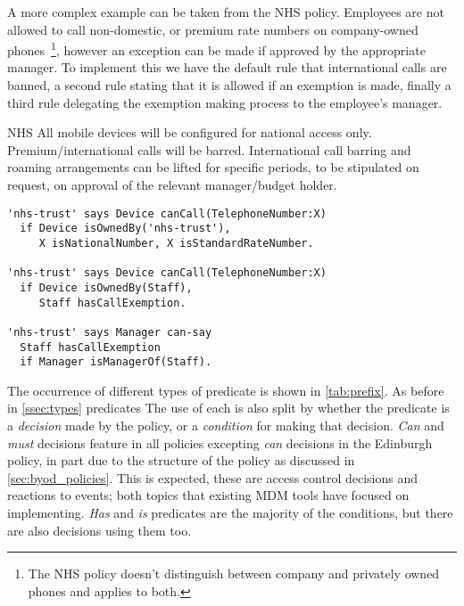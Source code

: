 \documentclass[thesis.tex]{subfiles}
\begin{document}
A more complex example can be taken from the NHS policy.
Employees are not allowed to call non-domestic, or premium rate numbers on
company-owned phones~\footnote{The NHS policy doesn't distinguish between
  company and privately owned phones and applies to both.}, however an exception can be made if approved by the appropriate manager.
To implement this we have the default rule that international calls are banned, a second rule stating that it is allowed if an exemption is made, finally a third rule delegating the exemption making process to the employee's manager.
\begin{policyrule}{NHS}
  All mobile devices will be configured for national access only. Premium/international calls will be barred.
  International call barring and roaming arrangements can be lifted for specific periods, to be stipulated on request, on approval of the relevant manager/budget holder.
  \upshape
  \begin{lstlisting}
'nhs-trust' says Device canCall(TelephoneNumber:X)
  if Device isOwnedBy('nhs-trust'),
     X isNationalNumber, X isStandardRateNumber.

'nhs-trust' says Device canCall(TelephoneNumber:X)
  if Device isOwnedBy(Staff),
     Staff hasCallExemption.

'nhs-trust' says Manager can-say
  Staff hasCallExemption
  if Manager isManagerOf(Staff).
  \end{lstlisting}
\end{policyrule}

The occurrence of different types of predicate is shown in \autoref{tab:prefix}.
As before in \autoref{ssec:types} predicates
The use of each is also split by whether the predicate is a \emph{decision} made by the policy, or a \emph{condition} for making that decision.
\emph{Can} and \emph{must} decisions feature in all policies excepting \emph{can} decisions in the Edinburgh policy, in part due to the structure of the policy as discussed in \autoref{sec:byod_policies}.
This is expected, these are access control decisions and reactions to events; both topics that existing MDM tools have focused on implementing.
\emph{Has} and \emph{is} predicates are the majority of the conditions, but there are also decisions using them too.
\end{document}
